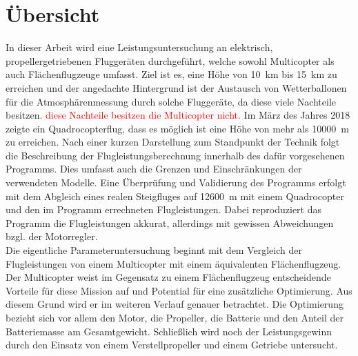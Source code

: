 \chapter*{Übersicht}
In dieser Arbeit wird eine Leistungsuntersuchung an elektrisch, propellergetriebenen Fluggeräten durchgeführt, welche sowohl Multicopter als auch Flächenflugzeuge umfasst. Ziel ist es, eine Höhe von \SI{10}{km} bis \SI{15}{km} zu erreichen und der angedachte Hintergrund ist der Austausch von Wetterballonen für die Atmosphärenmessung durch solche Fluggeräte, da diese viele Nachteile besitzen. \textcolor{red}{diese Nachteile besitzen die Multicopter nicht.} Im März des Jahres 2018 zeigte ein Quadrocopterflug, dass es möglich ist eine Höhe von mehr als \SI{10000}{m} zu erreichen. 
Nach einer kurzen Darstellung zum Standpunkt der Technik folgt die Beschreibung der Flugleistungsberechnung innerhalb des dafür vorgesehenen Programms. Dies umfasst auch die Grenzen und Einschränkungen der verwendeten Modelle. Eine Überprüfung und Validierung des Programms erfolgt mit dem Abgleich eines realen Steigfluges auf \SI{12600}{m} mit einem Quadrocopter und den im Programm errechneten Flugleistungen. Dabei reproduziert das Programm die Flugleistungen akkurat, allerdings mit gewissen Abweichungen bzgl. der Motorregler. \\
Die eigentliche Parameteruntersuchung beginnt mit dem Vergleich der Flugleistungen von einem Multicopter mit einem äquivalenten Flächenflugzeug. Der Multicopter weist im Gegensatz zu einem Flächenflugzeug entscheidende Vorteile für diese Mission auf und Potential für eine zusätzliche Optimierung. Aus diesem Grund wird er im weiteren Verlauf genauer betrachtet. Die Optimierung bezieht sich vor allem den Motor, die Propeller, die Batterie und den Anteil der Batteriemasse am Gesamtgewicht. Schließlich wird noch der Leistungsgewinn durch den Einsatz von einem Verstellpropeller und einem Getriebe untersucht. 


